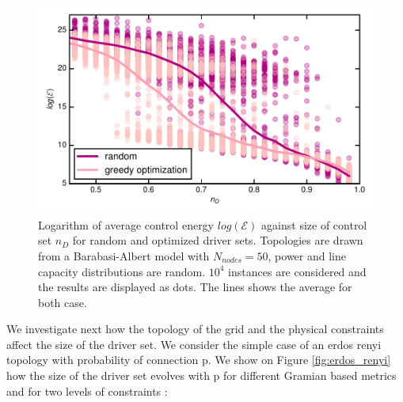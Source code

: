 \documentclass[conference]{IEEEtran}
\begin{document}


\begin{figure}
\includegraphics[scale=.55]{plot4.pdf}%
\caption{Logarithm of average control energy $log(\mathcal{E})$ against size of control set $n_D$ for random and optimized driver sets. Topologies are drawn from a Barabasi-Albert model with $ N_{nodes} = 50 $, power and line capacity distributions are random. $10^4$ instances are considered and the results are displayed as dots. The lines shows the average for both case. }
\label{fig:densities}
\end{figure}

We investigate next how the topology of the grid and the physical constraints affect the size of the driver set. We consider the simple case of an erdos renyi topology with probability of connection p. We show on Figure \ref{fig:erdos_renyi} how the size of the driver set evolves with p for different Gramian based metrics and for two levels of constraints : 
\end{document}
